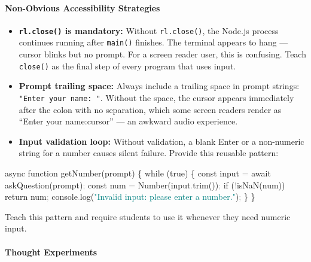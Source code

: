 \documentclass[
  justified,
  openright,
]{tufte-book}
\let\paragraph\paragraph
\newcommand{\BuiltInTok}[1]{#1}
\newcommand{\ControlFlowTok}[1]{\textcolor{BrandBlue}{#1}}
\newcommand{\FunctionTok}[1]{\textcolor{BrandBlue}{#1}}
\newcommand{\KeywordTok}[1]{\textcolor{BrandBlue}{#1}}
\newcommand{\NormalTok}[1]{#1}
\newcommand{\OperatorTok}[1]{\textcolor{DarkGray}{#1}}
\newcommand{\PreprocessorTok}[1]{\textcolor{BrandAccent}{#1}}
\newcommand{\StringTok}[1]{\textcolor{Teal}{#1}}
\newenvironment{Shaded}{%
  \begin{snugshade}
}{%
  \end{snugshade}
}
\let\paragraph\paragraph
\begin{document}
\paragraph{Non-Obvious Accessibility
Strategies}\label{non-obvious-accessibility-strategies-1}

\begin{itemize}
\item
  \textbf{\texttt{rl.close()} is mandatory:} Without
  \texttt{rl.close()}, the Node.js process continues running after
  \texttt{main()} finishes. The terminal appears to hang --- cursor
  blinks but no prompt. For a screen reader user, this is confusing.
  Teach \texttt{close()} as the final step of every program that uses
  input.
\item
  \textbf{Prompt trailing space:} Always include a trailing space in
  prompt strings: \texttt{"Enter\ your\ name:\ "}. Without the space,
  the cursor appears immediately after the colon with no separation,
  which some screen readers render as ``Enter your name:cursor'' --- an
  awkward audio experience.
\item
  \textbf{Input validation loop:} Without validation, a blank Enter or a
  non-numeric string for a number causes silent failure. Provide this
  reusable pattern:
\end{itemize}

\begin{Shaded}
\begin{Highlighting}[]
\KeywordTok{async} \KeywordTok{function} \FunctionTok{getNumber}\NormalTok{(prompt) \{}
  \ControlFlowTok{while}\NormalTok{ (}\KeywordTok{true}\NormalTok{) \{}
    \KeywordTok{const}\NormalTok{ input }\OperatorTok{=} \ControlFlowTok{await} \FunctionTok{askQuestion}\NormalTok{(prompt)}\OperatorTok{;}
    \KeywordTok{const}\NormalTok{ num }\OperatorTok{=} \BuiltInTok{Number}\NormalTok{(input}\OperatorTok{.}\FunctionTok{trim}\NormalTok{())}\OperatorTok{;}
    \ControlFlowTok{if}\NormalTok{ (}\OperatorTok{!}\PreprocessorTok{isNaN}\NormalTok{(num)) }\ControlFlowTok{return}\NormalTok{ num}\OperatorTok{;}
    \BuiltInTok{console}\OperatorTok{.}\FunctionTok{log}\NormalTok{(}\StringTok{"Invalid input: please enter a number."}\NormalTok{)}\OperatorTok{;}
\NormalTok{  \}}
\NormalTok{\}}
\end{Highlighting}
\end{Shaded}

Teach this pattern and require students to use it whenever they need
numeric input.

\paragraph{Thought Experiments}\label{thought-experiments-2}
\end{document}
